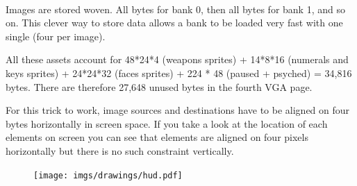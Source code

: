     \begin{minipage}{.3\textwidth}
  \end{minipage}
\begin{minipage}{.3\textwidth}
  \end{minipage}
\begin{minipage}{.3\textwidth}
  \end{minipage}
\par


\begin{minipage}{.1\textwidth}
  \end{minipage}
\begin{minipage}{.1\textwidth}
  \end{minipage}
\begin{minipage}{.1\textwidth}
  \end{minipage}
\begin{minipage}{.1\textwidth}
  \end{minipage}
  \begin{minipage}{.3\textwidth}
  \end{minipage}
\begin{minipage}{.3\textwidth}
  \end{minipage}\

 Images are stored woven. All bytes for bank 0, then all bytes for bank 1, and so on. This clever way to store data allows a bank to be loaded very fast with one single  (four  per image).\\
\par
All these assets account for 48*24*4 (weapons sprites) + 14*8*16 (numerals and keys sprites) + 24*24*32 (faces sprites) + 224 * 48 (paused + psyched) = 34,816 bytes. There are therefore 27,648 unused bytes in the fourth VGA page.\\
\par
For this trick to work, image sources and destinations have to be aligned on four bytes horizontally in screen space. If you take a look at the location of each elements on screen you can see that elements are aligned on four pixels horizontally but there is no such constraint vertically.
\begin{figure}[H]
  \centering
 \texttt{[image: imgs/drawings/hud.pdf]}
\end{figure}

